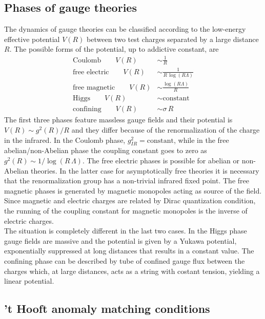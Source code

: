 \subsection{Phases of gauge theories}
The dynamics of gauge theories can be classified according to the low-energy effective potential $V(R)$ between two test charges separated by a large distance $R$.
The possible forms of the potential, up to addictive constant, are
\begin{align}
\text{Coulomb} \qquad V(R) & \sim \frac{1}{R} \\
\text{free electric} \qquad V(R) & \sim \frac{1}{R \, \log(R \Lambda) } \\
\text{free magnetic} \qquad V(R) & \sim \frac{\log(R \Lambda)}{R \,  }\\
\text{Higgs} \qquad V(R) & \sim \text{constant} \\
\text{confining} \qquad V(R) & \sim  \sigma \, R  
\end{align}
The first three phases feature massless gauge fields and their potential is $V(R) \sim g^2(R) / R$ and they differ because of the renormalization of the charge in the infrared.
In the Coulomb phase, $g^2_{IR} = \text{constant}$, while in the free abelian/non-Abelian phase the coupling constant goes to zero as $g^2(R) \sim 1/ \log(R \, \Lambda)$.
The free electric phases is possible for abelian or non-Abelian theories.
In the latter case for asymptotically free theories it is necessary that the renormalization group has a non-trivial infrared fixed point.
The free magnetic phases is generated by magnetic monopoles acting as source of the field. Since magnetic and electric charges are related by Dirac quantization condition, the running of the coupling constant for magnetic monopoles is the inverse of electric charges.\\
The situation is completely different in the last two cases.
In the Higgs phase gauge fields are massive and the potential is given by a Yukawa potential, exponentially suppressed at long distances that results in a constant value.
The confining phase can be described by tube of confined gauge flux between the charges which, at large distances, acts as a string with costant tension, yielding a linear potential.


\subsection{'t Hooft anomaly matching conditions}

